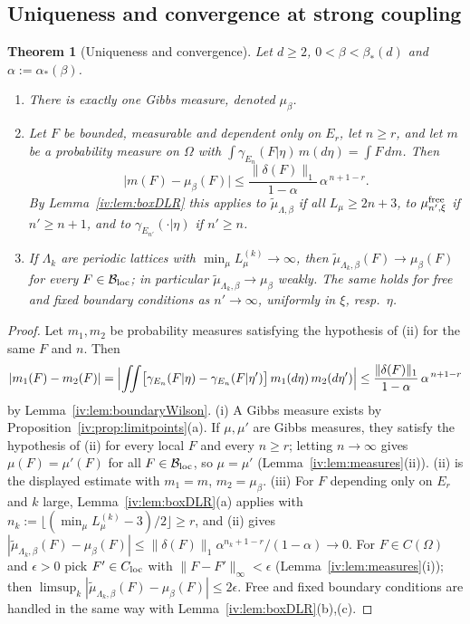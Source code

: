 \documentclass[11pt,a4paper]{article}
\newtheorem{theorem}{Theorem}[section]
\theoremstyle{definition}
\theoremstyle{remark}
\newcommand{\cB}{\mathcal{B}}
\newcommand{\norm}[1]{\lVert #1\rVert}
\newcommand{\aS}{\alpha_*}
\newcommand{\bS}{\beta_*}
\begin{document}
\subsection{Uniqueness and convergence at strong coupling}

\begin{theorem}[Uniqueness and convergence]\label{iv:thm:unique}
Let $d\ge2$, $0<\beta<\bS(d)$ and $\alpha:=\aS(\beta)$.
\begin{enumerate}[label=(\roman*)]
\item There is exactly one Gibbs measure, denoted $\mu_\beta$.
\item Let $F$ be bounded, measurable and dependent only on $E_r$, let $n\ge r$, and let $m$ be a probability measure on $\Omega$
with $\int\gamma_{E_n}(F|\eta)\,m(d\eta)=\int F\,dm$. Then
\[
\bigl|m(F)-\mu_\beta(F)\bigr|\le\frac{\norm{\delta(F)}_1}{1-\alpha}\,\alpha^{\,n+1-r}.
\]
By Lemma~\ref{iv:lem:boxDLR} this applies to $\tilde\mu_{\Lambda,\beta}$ if all $L_\mu\ge2n+3$, to $\mu^{\rm free}_{n',\xi}$ if
$n'\ge n+1$, and to $\gamma_{E_{n'}}(\cdot|\eta)$ if $n'\ge n$.
\item If $\Lambda_k$ are periodic lattices with $\min_\mu L^{(k)}_\mu\to\infty$, then
$\tilde\mu_{\Lambda_k,\beta}(F)\to\mu_\beta(F)$ for every $F\in\cB_{\rm loc}$; in particular $\tilde\mu_{\Lambda_k,\beta}\to\mu_\beta$
weakly. The same holds for free and fixed boundary conditions as $n'\to\infty$, uniformly in $\xi$, resp.\ $\eta$.
\end{enumerate}
\end{theorem}

\begin{proof}
Let $m_1,m_2$ be probability measures satisfying the hypothesis of (ii) for the same $F$ and $n$. Then
\[
|m_1(F)-m_2(F)|=\Bigl|\iint\bigl[\gamma_{E_n}(F|\eta)-\gamma_{E_n}(F|\eta')\bigr]\,m_1(d\eta)\,m_2(d\eta')\Bigr|
\le\frac{\norm{\delta(F)}_1}{1-\alpha}\,\alpha^{\,n+1-r}
\]
by Lemma~\ref{iv:lem:boundaryWilson}. (i) A Gibbs measure exists by Proposition~\ref{iv:prop:limitpoints}(a). If $\mu,\mu'$ are Gibbs
measures, they satisfy the hypothesis of (ii) for every local $F$ and every $n\ge r$; letting $n\to\infty$ gives $\mu(F)=\mu'(F)$
for all $F\in\cB_{\rm loc}$, so $\mu=\mu'$ (Lemma~\ref{iv:lem:measures}(ii)). (ii) is the displayed estimate with $m_1=m$,
$m_2=\mu_\beta$. (iii) For $F$ depending only on $E_r$ and $k$ large, Lemma~\ref{iv:lem:boxDLR}(a) applies with
$n_k:=\lfloor(\min_\mu L_\mu^{(k)}-3)/2\rfloor\ge r$, and (ii) gives
$|\tilde\mu_{\Lambda_k,\beta}(F)-\mu_\beta(F)|\le\norm{\delta(F)}_1\alpha^{n_k+1-r}/(1-\alpha)\to0$. For $F\in C(\Omega)$ and
$\epsilon>0$ pick $F'\in C_{\rm loc}$ with $\norm{F-F'}_\infty<\epsilon$ (Lemma~\ref{iv:lem:measures}(i)); then
$\limsup_k|\tilde\mu_{\Lambda_k,\beta}(F)-\mu_\beta(F)|\le2\epsilon$. Free and fixed boundary conditions are handled in the same way
with Lemma~\ref{iv:lem:boxDLR}(b),(c).
\end{proof}
\end{document}
